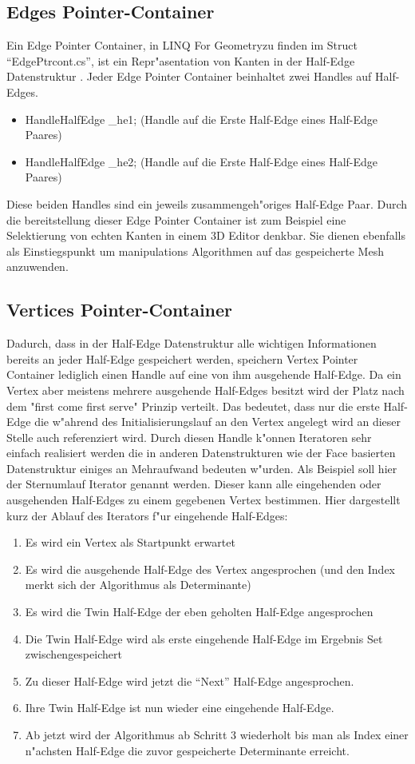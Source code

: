 \documentclass[pagesize, paper=a4, fontsize=12pt,titlepage=true, headings=small, headnosepline, abstractoff, liststotoc, nochapterprefix, plainheadsepline]{scrreprt}
\newcommand{\LFG}{LINQ For Geometry}
\newcommand{\HES}{Half-Edge Datenstruktur }
\begin{document}
		\subsection {Edges Pointer-Container}
			Ein Edge Pointer Container, in \LFG zu finden im Struct "`EdgePtrcont.cs"', ist ein Repr"asentation von Kanten in der \HES. Jeder Edge Pointer Container beinhaltet zwei Handles auf Half-Edges.
\begin{itemize}
\item HandleHalfEdge \_he1; (Handle auf die Erste Half-Edge eines Half-Edge Paares)
\item HandleHalfEdge \_he2; (Handle auf die Erste Half-Edge eines Half-Edge Paares)
\end{itemize}
Diese beiden Handles sind ein jeweils zusammengeh"origes Half-Edge Paar. Durch die bereitstellung dieser Edge Pointer Container ist zum Beispiel eine Selektierung von echten Kanten in einem 3D Editor denkbar. Sie dienen ebenfalls als Einstiegspunkt um manipulations Algorithmen auf das gespeicherte Mesh anzuwenden.
		\subsection {Vertices Pointer-Container}
			Dadurch, dass in der Half-Edge Datenstruktur alle wichtigen Informationen bereits an jeder Half-Edge gespeichert werden, speichern Vertex Pointer Container lediglich einen Handle auf eine von ihm ausgehende Half-Edge. Da ein Vertex aber meistens mehrere ausgehende Half-Edges besitzt wird der Platz nach dem "first come first serve" Prinzip verteilt. Das bedeutet, dass nur die erste Half-Edge die w"ahrend des Initialisierungslauf an den Vertex angelegt wird an dieser Stelle auch referenziert wird. Durch diesen Handle k"onnen Iteratoren sehr einfach realisiert werden die in anderen Datenstrukturen wie der Face basierten Datenstruktur einiges an Mehraufwand bedeuten w"urden. Als Beispiel soll hier der Sternumlauf Iterator genannt werden. Dieser kann alle eingehenden oder ausgehenden Half-Edges zu einem gegebenen Vertex bestimmen. Hier dargestellt kurz der Ablauf des Iterators f"ur eingehende Half-Edges:
\begin{enumerate}
\item Es wird ein Vertex als Startpunkt erwartet
\item Es wird die ausgehende Half-Edge des Vertex angesprochen (und den Index merkt sich der Algorithmus als Determinante)
\item Es wird die Twin Half-Edge der eben geholten Half-Edge angesprochen
\item Die Twin Half-Edge wird als erste eingehende Half-Edge im Ergebnis Set zwischengespeichert
\item Zu dieser Half-Edge wird jetzt die "`Next"' Half-Edge angesprochen.
\item Ihre Twin Half-Edge ist nun wieder eine eingehende Half-Edge.
\item Ab jetzt wird der Algorithmus ab Schritt 3 wiederholt bis man als Index einer n"achsten Half-Edge die zuvor gespeicherte Determinante erreicht.
\end{enumerate}
\end{document}
